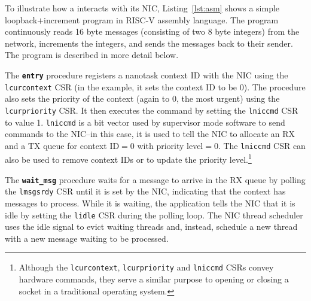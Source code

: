 
{
\vspace{-20pt}
\label{lst:asm}}

%

To illustrate how a \name{} interacts with its NIC, Listing~\ref{lst:asm} shows a simple loopback$+$increment program in RISC-V assembly language.  The program continuously reads 16 byte messages (consisting of two 8 byte integers) from the network, increments the integers, and sends the messages back to their sender. The program is described in more detail below.

The \textbf{\texttt{entry}} procedure registers a nanotask context ID with the NIC using the \texttt{lcurcontext} CSR (in the example, it sets the context ID to be 0). The procedure also sets the priority of the context (again to 0, the most urgent) using the  \texttt{lcurpriority} CSR. It then executes the command by setting the \texttt{lniccmd} CSR to value 1. \texttt{lniccmd} is a bit vector used by supervisor mode software to send commands to the NIC--in this case, it is used to tell the NIC to allocate an RX and a TX queue for context ID$=0$ with priority level$=0$. The \texttt{lniccmd} CSR can also be used to remove context IDs or to update the priority level.\footnote{Although the \texttt{lcurcontext}, \texttt{lcurpriority} and \texttt{lniccmd} CSRs convey hardware commands, they serve a similar purpose to opening or closing a socket in a traditional operating system.}

The \textbf{\texttt{wait\_msg}} procedure waits for a message to arrive in the RX queue by polling the \texttt{lmsgsrdy} CSR until it is set by the NIC, indicating that the context has messages to process. While it is waiting, the application tells the NIC that it is idle by setting the \texttt{lidle} CSR during the polling loop. The NIC thread scheduler uses the idle signal to evict waiting threads and, instead, schedule a new thread with a new message waiting to be processed. 

